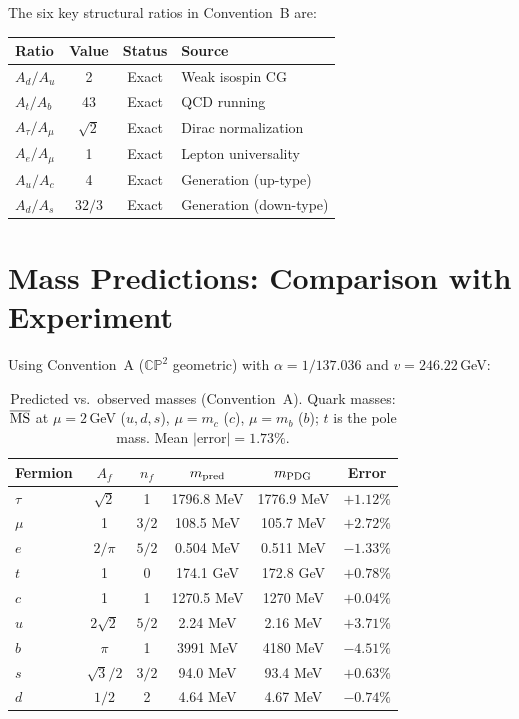 \documentclass[11pt,a4paper]{article}
\newcommand{\CP}{\mathbb{CP}}
\theoremstyle{definition}
\theoremstyle{remark}
\begin{document}
The six key structural ratios in Convention~B are:

\begin{center}
\begin{tabular}{lccl}
\toprule
Ratio & Value & Status & Source \\
\midrule
$A_d / A_u$ & 2 & Exact & Weak isospin CG \\
$A_t / A_b$ & 43 & Exact & QCD running \\
$A_\tau / A_\mu$ & $\sqrt{2}$ & Exact & Dirac normalization \\
$A_e / A_\mu$ & 1 & Exact & Lepton universality \\
$A_u / A_c$ & 4 & Exact & Generation (up-type) \\
$A_d / A_s$ & $32/3$ & Exact & Generation (down-type) \\
\bottomrule
\end{tabular}
\end{center}

\section{Mass Predictions: Comparison with Experiment}
\label{sec:results}

Using Convention~A ($\CP^2$ geometric) with $\alpha = 1/137.036$ and
$v = 246.22$\,GeV:

\begin{table}[h]
\centering
\begin{tabular}{lccccc}
\toprule
Fermion & $A_f$ & $n_f$ & $m_{\rm pred}$ & $m_{\rm PDG}$ & Error \\
\midrule
$\tau$ & $\sqrt{2}$ & 1 & 1796.8 MeV & 1776.9 MeV & $+1.12\%$ \\
$\mu$ & 1 & $3/2$ & 108.5 MeV & 105.7 MeV & $+2.72\%$ \\
$e$ & $2/\pi$ & $5/2$ & 0.504 MeV & 0.511 MeV & $-1.33\%$ \\
\midrule
$t$ & 1 & 0 & 174.1 GeV & 172.8 GeV & $+0.78\%$ \\
$c$ & 1 & 1 & 1270.5 MeV & 1270 MeV & $+0.04\%$ \\
$u$ & $2\sqrt{2}$ & $5/2$ & 2.24 MeV & 2.16 MeV & $+3.71\%$ \\
\midrule
$b$ & $\pi$ & 1 & 3991 MeV & 4180 MeV & $-4.51\%$ \\
$s$ & $\sqrt{3}/2$ & $3/2$ & 94.0 MeV & 93.4 MeV & $+0.63\%$ \\
$d$ & $1/2$ & 2 & 4.64 MeV & 4.67 MeV & $-0.74\%$ \\
\bottomrule
\end{tabular}
\caption{Predicted vs.\ observed masses (Convention~A).
Quark masses: $\overline{\rm MS}$ at $\mu = 2$\,GeV ($u,d,s$),
$\mu = m_c$ ($c$), $\mu = m_b$ ($b$); $t$ is the pole mass.
Mean $|$error$| = 1.73\%$.}
\label{tab:masses}
\end{table}
\end{document}
